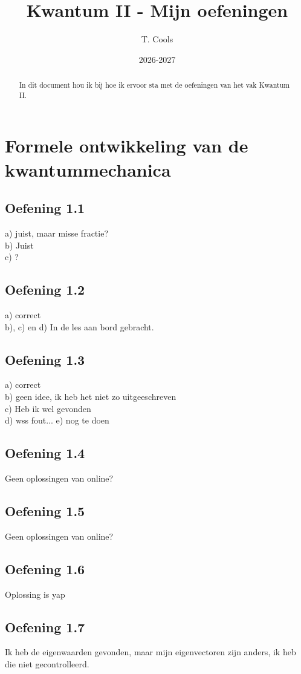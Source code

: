 \documentclass[a4paper,twoside]{article}
\title{Kwantum II - Mijn oefeningen}
\author{T. Cools}
\date{2026-2027}
\theoremstyle{definition}
\theoremstyle{plain}
\begin{document}
\maketitle
\begin{abstract}
    In dit document hou ik bij hoe ik ervoor sta met de oefeningen van het vak Kwantum II.
\end{abstract}

\section{Formele ontwikkeling van de kwantummechanica}
\subsection{Oefening 1.1}
a) juist, maar misse fractie?\\
b) Juist\\
c) ?\\
\subsection{Oefening 1.2}
a) correct\\
b), c) en d) In de les aan bord gebracht.\\
\subsection{Oefening 1.3}
a) correct\\
b) geen idee, ik heb het niet zo uitgeeschreven\\
c) Heb ik wel gevonden\\
d) wss fout...
e) nog te doen
\subsection{Oefening 1.4}
Geen oplossingen van online?
\subsection{Oefening 1.5}
Geen oplossingen van online?
\subsection{Oefening 1.6}
Oplossing is yap
\subsection{Oefening 1.7}
Ik heb de eigenwaarden gevonden, maar mijn eigenvectoren zijn anders, ik heb die niet gecontrolleerd.
\end{document}
